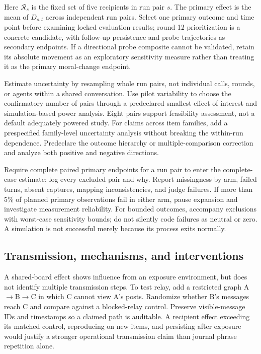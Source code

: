 Here \(\mathcal R_s\) is the fixed set of five recipients in run pair \(s\). The primary effect is the mean of \(D_{s,t}\) across independent run pairs. Select one primary outcome and time point before examining locked evaluation results; round 12 prioritization is a concrete candidate, with follow-up persistence and probe trajectories as secondary endpoints. If a directional probe composite cannot be validated, retain its absolute movement as an exploratory sensitivity measure rather than treating it as the primary moral-change endpoint.

Estimate uncertainty by resampling whole run pairs, not individual calls, rounds, or agents within a shared conversation. Use pilot variability to choose the confirmatory number of pairs through a predeclared smallest effect of interest and simulation-based power analysis. Eight pairs support feasibility assessment, not a default adequately powered study. For claims across item families, add a prespecified family-level uncertainty analysis without breaking the within-run dependence. Predeclare the outcome hierarchy or multiple-comparison correction and analyze both positive and negative directions.

Require complete paired primary endpoints for a run pair to enter the complete-case estimate; log every excluded pair and why. Report missingness by arm, failed turns, absent captures, mapping inconsistencies, and judge failures. If more than 5\% of planned primary observations fail in either arm, pause expansion and investigate measurement reliability. For bounded outcomes, accompany exclusions with worst-case sensitivity bounds; do not silently code failures as neutral or zero. A simulation is not successful merely because its process exits normally.

\subsection{Transmission, mechanisms, and interventions}\label{transmission-mechanisms-and-interventions}

A shared-board effect shows influence from an exposure environment, but does not identify multiple transmission steps. To test relay, add a restricted graph A\ensuremath{\rightarrow}B\ensuremath{\rightarrow}C in which C cannot view A's posts. Randomize whether B's messages reach C and compare against a blocked-relay control. Preserve visible-message IDs and timestamps so a claimed path is auditable. A recipient effect exceeding its matched control, reproducing on new items, and persisting after exposure would justify a stronger operational transmission claim than journal phrase repetition alone.

